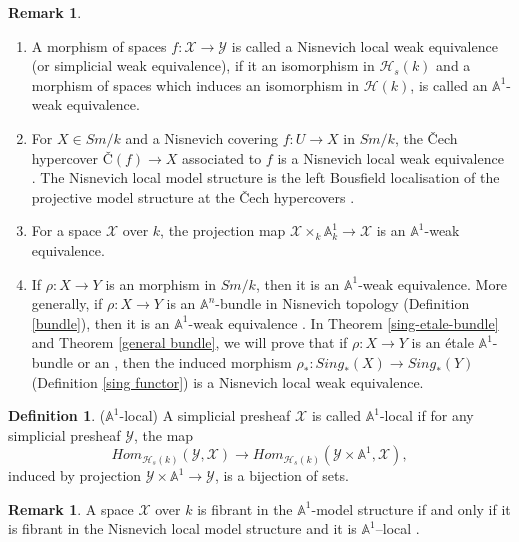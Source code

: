 \documentclass[11pt, reqno]{amsart}
\theoremstyle{plain}
\theoremstyle{definition}
\newtheorem{remark}[thm]{Remark}
\newtheorem{definition}[thm]{Definition}
\newcommand{\sF}{{\mathcal F}}
\newcommand{\sH}{{\mathcal H}}
\newcommand{\sX}{{\mathcal X}}
\newcommand{\sY}{{\mathcal Y}}
\newcommand{\A}{{\mathbb A}}
\begin{document}
			\begin{remark}
    			\begin{enumerate}
        \item A morphism of spaces $f: \sX \to \sY$ is called a Nisnevich local weak equivalence (or simplicial weak equivalence), if it an isomorphism in $\mathcal{H}_s(k)$ and a morphism of spaces which induces an isomorphism in $\mathcal{H}(k)$, is called an $\mathbb{A}^1$-weak equivalence.
        \item For $X \in Sm/k$ and a Nisnevich covering $f: U \to X$ in $Sm/k$, the \v{C}ech hypercover $\text{\v{C}}(f) \to X$ associated to $f$ is a Nisnevich local weak equivalence \cite[Lemma 1.15, Section 2.1]{mv}. The Nisnevich local model structure is the left Bousfield localisation of the projective model structure at the \v{C}ech hypercovers \cite[Proposition 8.1]{dugger}.
        \item For a space $\mathcal{X}$ over $k$, the projection map $\mathcal{X} \times_k \mathbb{A}^1_k \to \mathcal{X}$ is an $\mathbb{A}^1$-weak equivalence.
        \item If $\rho: X \to Y$ is an  morphism in $Sm/k$, then it is an $\mathbb{A}^1$-weak equivalence. More generally, if $\rho: X \to Y$ is an $\mathbb{A}^n$-bundle in Nisnevich topology (Definition \ref{bundle}), then it is an $\mathbb{A}^1$-weak equivalence \cite[Example 2.3, Section 3.1]{mv}. In Theorem \ref{sing-etale-bundle} and Theorem \ref{general bundle}, we will prove that if $\rho: X \to Y$ is an \'etale $\mathbb{A}^1$-bundle or an , then the induced morphism $\rho_*: Sing_*(X) \to Sing_*(Y)$ (Definition \ref{sing functor}) is a Nisnevich local weak equivalence.
    			\end{enumerate}
			\end{remark}
\begin{definition}($\A^1$-local) \cite[Definition 2.1, Section 3.2]{mv} \label{a1 local definition} \hfill
 A simplicial presheaf $\sX$ 
		is called $\A^1$-local if for any simplicial presheaf $\sY$, 
		the map
		$$Hom_{\sH_s(k)}(\sY,\sX)\to Hom_{\sH_s(k)}(\sY\times\A^1,\sX),$$
		induced by projection $\sY\times\A^1 \to \sY$, is a bijection of sets. 
\end{definition}
\begin{remark}
A space $\sX$ over $k$ is fibrant in the $\A^1$-model structure if and only if it is fibrant in the Nisnevich local model structure and it is $\mathbb{A}^1$–local
\cite[Proposition 3.19, Section 2.3]{mv}.
\end{remark}
\end{document}
